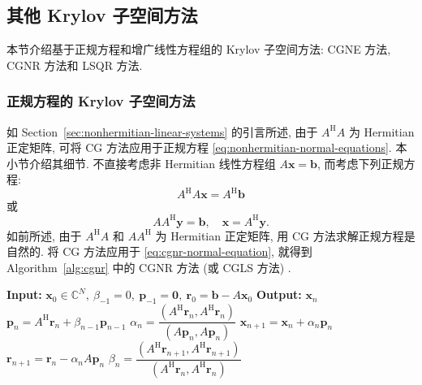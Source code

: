 \subsection{{其他 Krylov 子空间方法}}\label{sec:other-krylov-methods}
{本节介绍基于正规方程和增广线性方程组的 Krylov 子空间方法: CGNE 方法, CGNR 方法和 LSQR 方法.}
\subsubsection{{正规方程的 Krylov 子空间方法}}\label{subsec:cg-normal-equations}
{如 Section\ \ref{sec:nonhermitian-linear-systems} 的引言所述, 由于 $A^{\mathrm H}A$ 为 Hermitian 正定矩阵, 可将 CG 方法应用于正规方程 \eqref{eq:nonhermitian-normal-equations}. 本小节介绍其细节. 不直接考虑非 Hermitian 线性方程组 $A\bm x=\bm b$, 而考虑下列正规方程:}
\begin{equation}\label{eq:cgnr-normal-equation}A^{\mathrm H}A\bm x=A^{\mathrm H}\bm b\end{equation}
{或}
\begin{equation}\label{eq:cgne-normal-equation}AA^{\mathrm H}\bm y=\bm b,\quad\bm x=A^{\mathrm H}\bm y.\end{equation}
{\leavevmode{}\label{idx:chapter-03-section-04:cgnr-introduction}如前所述, 由于 $A^{\mathrm H}A$ 和 $AA^{\mathrm H}$ 为 Hermitian 正定矩阵, 用 CG 方法求解正规方程是自然的. 将 CG 方法应用于 \eqref{eq:cgnr-normal-equation}, 就得到 Algorithm\ \ref{alg:cgnr} 中的 CGNR 方法 (或 CGLS 方法) .}
\begin{algorithm}[H]\caption{{CGNR 方法}}\label{alg:cgnr}\begin{algorithmic}[1]
\Statex\textbf{Input:} $\bm x_0\in\mathbb C^N,\ \beta_{-1}=0,\ \bm p_{-1}=\bm0,\ \bm r_0=\bm b-A\bm x_0$
\Statex\textbf{Output:} $\bm x_n$
\State $\bm p_n=A^{\mathrm H}\bm r_n+\beta_{n-1}\bm p_{n-1}$
\State $\alpha_n=\dfrac{(A^{\mathrm H}\bm r_n,A^{\mathrm H}\bm r_n)}{(A\bm p_n,A\bm p_n)}$
\State $\bm x_{n+1}=\bm x_n+\alpha_n\bm p_n$
\State $\bm r_{n+1}=\bm r_n-\alpha_nA\bm p_n$
\State $\beta_n=\dfrac{(A^{\mathrm H}\bm r_{n+1},A^{\mathrm H}\bm r_{n+1})}{(A^{\mathrm H}\bm r_n,A^{\mathrm H}\bm r_n)}$
\EndFor\end{algorithmic}\end{algorithm}
